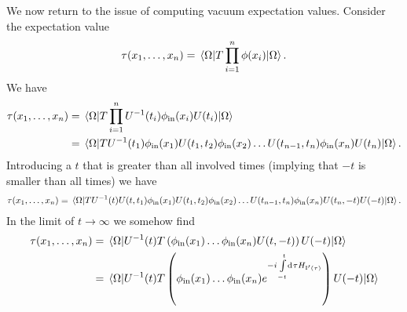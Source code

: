 We now return to the issue of computing vacuum expectation values. Consider the expectation value
\begin{align*}
	\tau(x_{1}, \dots, x_{n}) = \expval{\ensuremath{T}\prod\limits_{i = 1}^{n}\phi(x_{i})}{\Omega}.
\end{align*}
We have
\begin{align*}
	\tau(x_{1}, \dots, x_{n}) &= \expval{\ensuremath{T}\prod\limits_{i = 1}^{n}U^{-1}(t_{i})\phi_{\text{in}}(x_{i})U(t_{i})}{\Omega} \\
	                          &= \expval{\ensuremath{T}U^{-1}(t_{1})\phi_{\text{in}}(x_{1})U(t_{1}, t_{2})\phi_{\text{in}}(x_{2})\dots U(t_{n - 1}, t_{n})\phi_{\text{in}}(x_{n})U(t_{n})}{\Omega}.
\end{align*}
Introducing a $t$ that is greater than all involved times (implying that $-t$ is smaller than all times) we have
\begin{align*}
	\tau(x_{1}, \dots, x_{n}) = \expval{\ensuremath{T}U^{-1}(t)U(t, t_{1})\phi_{\text{in}}(x_{1})U(t_{1}, t_{2})\phi_{\text{in}}(x_{2})\dots U(t_{n - 1}, t_{n})\phi_{\text{in}}(x_{n})U(t_{n}, -t)U(-t)}{\Omega}.
\end{align*}
In the limit of $t\to\infty$ we somehow find
\begin{align*}
	\tau(x_{1}, \dots, x_{n}) &= \expval{U^{-1}(t)\ensuremath{T}\left(\phi_{\text{in}}(x_{1})\dots \phi_{\text{in}}(x_{n})U(t, -t)\right)U(-t)}{\Omega} \\
	                          &= \expval{U^{-1}(t)\ensuremath{T}\left(\phi_{\text{in}}(x_{1})\dots \phi_{\text{in}}(x_{n})e^{-i\int\limits_{-t}^{t}\dd[]{\tau}H_{\text{I}\ensuremath{^{\prime}}(\tau)}}\right)U(-t)}{\Omega}
\end{align*}

